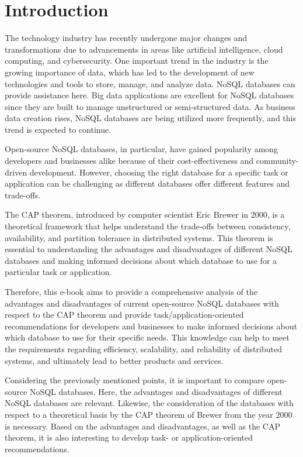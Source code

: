 
\chapter{Introduction} \label{ch:introduction}

The technology industry has recently undergone major changes and transformations due to advancements in areas like artificial intelligence, cloud computing, and cybersecurity. One important trend in the industry is the growing importance of data, which has led to the development of new technologies and tools to store, manage, and analyze data. \ac{NoSQL} databases can provide assistance here. Big data applications are excellent for \acs{NoSQL} databases since they are built to manage unstructured or semi-structured data. As business data creation rises, \acs{NoSQL} databases are being utilized more frequently, and this trend is expected to continue. 

Open-source \acs{NoSQL} databases, in particular, have gained popularity among developers and businesses alike because of their cost-effectiveness and community-driven development. However, choosing the right database for a specific task or application can be challenging as different databases offer different features and trade-offs.

The \ac{CAP} theorem, introduced by computer scientist Eric Brewer in 2000, is a theoretical framework that helps understand the trade-offs between consistency, availability, and partition tolerance in distributed systems. This theorem is essential to understanding the advantages and disadvantages of different \acs{NoSQL} databases and making informed decisions about which database to use for a particular task or application.

Therefore, this e-book aims to provide a comprehensive analysis of the advantages and disadvantages of current open-source \acs{NoSQL} databases with respect to the \acs{CAP} theorem and provide task/application-oriented recommendations for developers and businesses to make informed decisions about which database to use for their specific needs. This knowledge can help to meet the requirements regarding efficiency, scalability, and reliability of distributed systems, and ultimately lead to better products and services.

Considering the previously mentioned points, it is important to compare open-source \acs{NoSQL} databases. Here, the advantages and disadvantages of different \acs{NoSQL} databases are relevant. Likewise, the consideration of the databases with respect to a theoretical basis by the \ac{CAP} theorem of Brewer from the year 2000 is necessary. Based on the advantages and disadvantages, as well as the \acs{CAP} theorem, it is also interesting to develop task- or application-oriented recommendations. 

